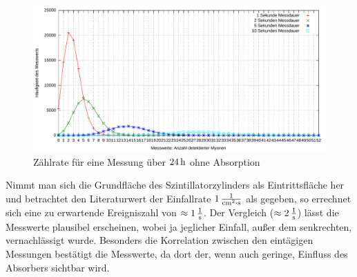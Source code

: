 \documentclass[numbers=noenddot,12pt,a4paper]{scrartcl}
\begin{document}
\begin{figure}[H]
	\centering
	\includegraphics[width=\textwidth]{messwerte/histozweitertag.pdf}
	\caption{Zählrate für eine Messung über $\unit[24]{h}$ ohne Absorption}\label{img:zählzweiter}
\end{figure}	
Nimmt man sich die Grundfläche des Szintillatorzylinders als Eintrittsfläche her und betrachtet den Literaturwert der Einfallrate $\unit[1]{\frac{1}{cm^2\cdot s}}$ als gegeben, so errechnet sich eine zu erwartende Ereigniszahl von $\approx\unit[1]{\frac{1}{s}}$. Der Vergleich ($\approx\unit[2]{\frac{1}{s}}$) lässt die Messwerte plausibel erscheinen, wobei ja jeglicher Einfall, außer dem senkrechten, vernachlässigt wurde. Besonders die Korrelation zwischen den eintägigen Messungen bestätigt die Messwerte, da dort der, wenn auch geringe, Einfluss des Absorbers sichtbar wird.
\end{document}
